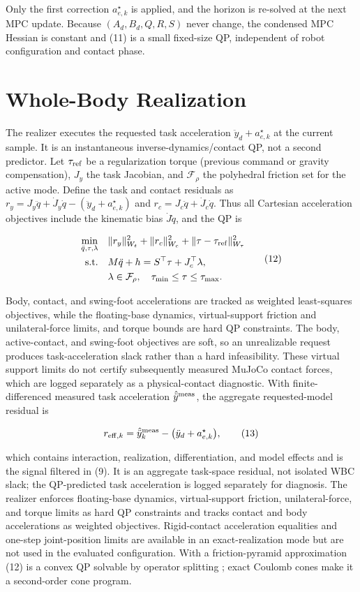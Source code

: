 \documentclass[journal]{IEEEtran}
\theoremstyle{plain}
\theoremstyle{definition}
\begin{document}
Only the first correction \(a_{e,k}^\star\) is applied, and the horizon is re-solved at the next MPC update. Because \((A_d,B_d,Q,R,S)\) never change, the condensed MPC Hessian is constant and (11) is a small fixed-size QP, independent of robot configuration and contact phase.

\section{Whole-Body Realization}\label{sec:realizer}

The realizer executes the requested task acceleration \(\ddot y_d+a_{e,k}^\star\) at the current sample. It is an instantaneous inverse-dynamics/contact QP, not a second predictor. Let \(\tau_{\rm ref}\) be a regularization torque (previous command or gravity compensation), \(J_y\) the task Jacobian, and \(\mathcal F_\rho\) the polyhedral friction set for the active mode. Define the task and contact residuals as \(r_y=J_y\ddot q+\dot J_y\dot q-(\ddot y_d+a_{e,k}^\star)\) and \(r_c=J_c\ddot q+\dot J_c\dot q\). Thus all Cartesian acceleration objectives include the kinematic bias \(\dot J\dot q\), and the QP is

\[
\begin{aligned}
\min_{\ddot q,\tau,\lambda}\quad&
\|r_y\|_{W_t}^2+\|r_c\|_{W_c}^2
+\|\tau-\tau_{\rm ref}\|_{W_\tau}^2\\
\text{s.t.}\quad&
M\ddot q+h=S^\top\tau+J_c^\top\lambda,\\
&\lambda\in\mathcal F_\rho,\quad \tau_{\min}\le\tau\le\tau_{\max}.
\end{aligned}
\tag{12}
\]

Body, contact, and swing-foot accelerations are tracked as weighted least-squares objectives, while the floating-base dynamics, virtual-support friction and unilateral-force limits, and torque bounds are hard QP constraints. The body, active-contact, and swing-foot objectives are soft, so an unrealizable request produces task-acceleration slack rather than a hard infeasibility. These virtual support limits do not certify subsequently measured MuJoCo contact forces, which are logged separately as a physical-contact diagnostic. With finite-differenced measured task acceleration \(\hat{\ddot y}^{\rm meas}\), the aggregate requested-model residual is

\[
r_{{\rm eff},k}=\hat{\ddot y}^{\rm meas}_k-\big(\ddot y_d+a_{e,k}^\star\big),
\tag{13}
\]

which contains interaction, realization, differentiation, and model effects and is the signal filtered in (9). It is an aggregate task-space residual, not isolated WBC slack; the QP-predicted task acceleration is logged separately for diagnosis. The realizer enforces floating-base dynamics, virtual-support friction, unilateral-force, and torque limits as hard QP constraints and tracks contact and body accelerations as weighted objectives. Rigid-contact acceleration equalities and one-step joint-position limits are available in an exact-realization mode but are not used in the evaluated configuration. With a friction-pyramid approximation (12) is a convex QP solvable by operator splitting \cite{ref14}; exact Coulomb cones make it a second-order cone program.
\end{document}
